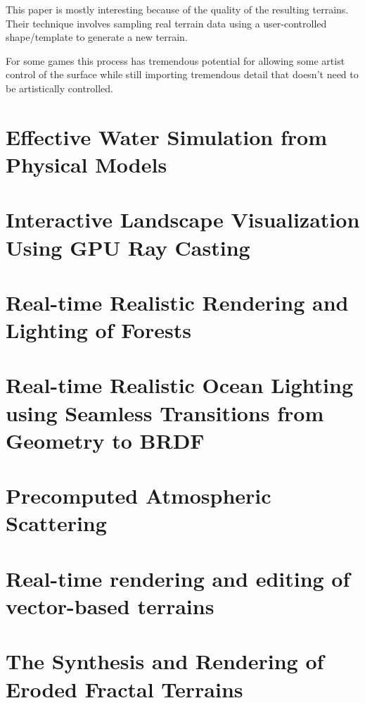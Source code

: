 This paper is mostly interesting because of the quality of the resulting terrains.
Their technique involves sampling real terrain data using a user-controlled shape/template to generate a new terrain.

For some games this process has tremendous potential for allowing some artist control of the surface while still importing tremendous detail that doesn't need to be artistically controlled.


\section{Effective Water Simulation from Physical Models}


\section{Interactive Landscape Visualization Using GPU Ray Casting}


\section{Real-time Realistic Rendering and Lighting of Forests}


\section{Real-time Realistic Ocean Lighting using Seamless Transitions from Geometry to BRDF}


\section{Precomputed Atmospheric Scattering}


\section{Real-time rendering and editing of vector-based terrains}


\section{The Synthesis and Rendering of Eroded Fractal Terrains}


